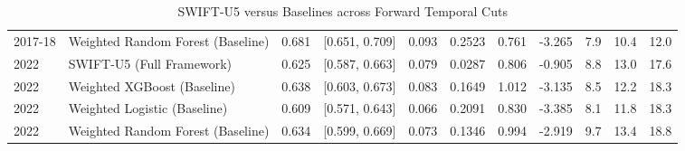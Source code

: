 \begin{table}[htbp]
\begin{tabular}{lllllllllll}
2017-18 & Weighted Random Forest (Baseline) & 0.681 & [0.651, 0.709] & 0.093 & 0.2523 & 0.761 & -3.265 & 7.9 & 10.4 & 12.0 \\
2022 & SWIFT-U5 (Full Framework) & 0.625 & [0.587, 0.663] & 0.079 & 0.0287 & 0.806 & -0.905 & 8.8 & 13.0 & 17.6 \\
2022 & Weighted XGBoost (Baseline) & 0.638 & [0.603, 0.673] & 0.083 & 0.1649 & 1.012 & -3.135 & 8.5 & 12.2 & 18.3 \\
2022 & Weighted Logistic (Baseline) & 0.609 & [0.571, 0.643] & 0.066 & 0.2091 & 0.830 & -3.385 & 8.1 & 11.8 & 18.3 \\
2022 & Weighted Random Forest (Baseline) & 0.634 & [0.599, 0.669] & 0.073 & 0.1346 & 0.994 & -2.919 & 9.7 & 13.4 & 18.8 \\
\bottomrule
\end{tabular}
\caption{SWIFT-U5 versus Baselines across Forward Temporal Cuts}
\label{tab:table4_benchmark}
\end{table}